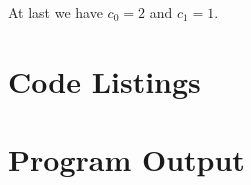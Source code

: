 \documentclass[10pt,letterpaper]{report}
\begin{document}
\begin{enumerate}
	At last we have $c_0 = 2$ and $c_1 = 1$.

\end{enumerate}


\begin{appendices}
\chapter{Code Listings}


\chapter{Program Output}
\end{appendices}
\end{document}
